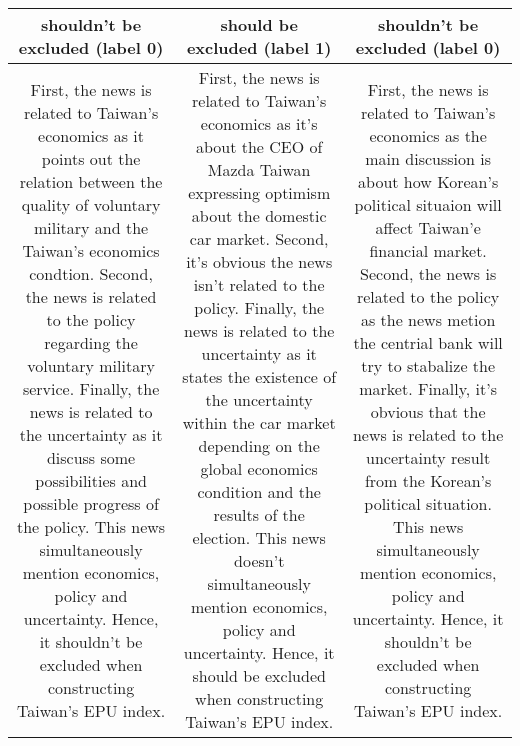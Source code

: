 {\begin{tabularx}{\textwidth}{c c c}
\textbf{shouldn't be excluded (label 0)} & 
\textbf{should be excluded (label 1)} &
\textbf{shouldn't be excluded (label 0)}\\
\hline
First, the news is related to Taiwan's economics as it points out the relation between the quality of voluntary military and the Taiwan's economics condtion. Second, the news is related to the policy regarding the voluntary military service. Finally, the news is related to the uncertainty as it discuss some possibilities and possible progress of the policy. This news simultaneously mention economics, policy and uncertainty. Hence, it shouldn't be excluded when constructing Taiwan's EPU index.
&
First, the news is related to Taiwan's economics as it's about the CEO of Mazda Taiwan expressing optimism about the domestic car market. Second, it's obvious the news isn't related to the policy. Finally, the news is related to the uncertainty as it states the existence of the uncertainty within the car market depending on the  global economics condition and the results of the election. This news doesn't simultaneously mention economics, policy and uncertainty. Hence, it should be excluded when constructing Taiwan's EPU index.
&
First, the news is related to Taiwan's economics as the main discussion is about how Korean's political situaion will affect Taiwan'e financial market. Second, the news is related to the policy as the news metion the centrial bank will try to stabalize the market. Finally, it's obvious that the news is related to the uncertainty result from the Korean's political situation. This news simultaneously mention economics, policy and uncertainty. Hence, it shouldn't be excluded when constructing Taiwan's EPU index.
\\
\hline
\end{tabularx}
}
